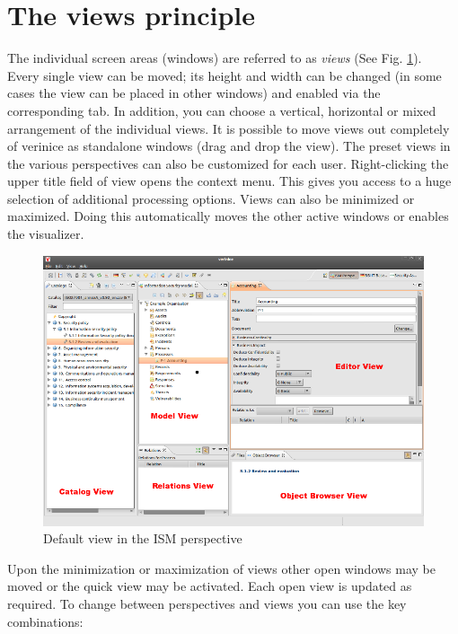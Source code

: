 \documentclass[a4paper,10pt]{book}
\begin{document}
\section{The views principle}
The individual screen areas (windows) are referred to as {\em views} (See Fig. \ref{Default view in the ISM perspective}).
\newline\\
 Every single view can be moved; its height and width can be changed (in some cases the view can be placed
 in other windows) and enabled via the corresponding tab. In addition, you can choose a vertical, horizontal or
 mixed arrangement of the individual views. It is possible to move views out completely of verinice as
 standalone windows (drag and drop the view). The preset views in the various perspectives can also be
 customized for each user. Right-clicking the upper title field of view opens the context menu. This gives
 you access to a huge selection of additional processing options. Views can also be minimized or maximized.
 Doing this automatically moves the other active windows or enables the visualizer.
\newline\\
\begin{figure}[htb!]
  \centering
  \includegraphics[scale=.35]{Screenshot/800px-Sichten-Prinzip-en.png}
  \caption{\label{Default view in the ISM perspective} Default view in the ISM perspective}
\end{figure}
Upon the minimization or maximization of views other open windows may be moved or the quick view may be
activated. Each open view is updated as required. To change between perspectives and views you can use the key combinations:
\end{document}
